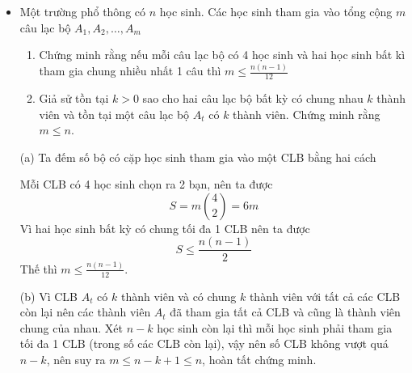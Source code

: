 \documentclass[11pt]{scrartcl}
\begin{document}
\setcounter{page}{1}
\thispagestyle{plain}
\begin{itemize}[label=, leftmargin=0em, itemsep=0.5em]
    
    \vspace{1em}
    
   
    \item \begin{bt}
        Một trường phổ thông có $n$ học sinh. Các học sinh tham gia vào tổng cộng $m$ câu lạc bộ $A_1,A_2,\dots,A_m$
        \begin{enumerate}[label=(\alph*)]
            \item Chứng minh rằng nếu mỗi câu lạc bộ có 4 học sinh và hai học sinh bất kì tham gia chung nhiều nhất 1 câu thì $m \leq \frac{n(n - 1)}{12}$
            \item Giả sử tồn tại $k > 0$ sao cho hai câu lạc bộ bất kỳ có chung nhau $k$ thành viên và tồn tại một câu lạc bộ $A_t$ có $k$ thành viên. Chứng minh rằng $m \leq n$.
        \end{enumerate}
    \end{bt}
    \begin{sol}

        (a) Ta đếm số bộ có cặp học sinh tham gia vào một CLB bằng hai cách 

         Mỗi CLB có 4 học sinh chọn ra 2 bạn, nên ta được 
        \[
            S = m\binom{4}{2} = 6m 
        \]
         Vì hai học sinh bất kỳ có chung tối đa 1 CLB nên ta được 
        \[
            S \leq \frac{n(n - 1)}{2}
        \]
        Thế thì $m \leq \frac{n(n - 1)}{12}$.

        (b) Vì CLB $A_t$ có $k$ thành viên và có chung $k$ thành viên với tất cả các CLB còn lại nên các thành viên $A_t$ đã tham gia tất cả CLB và cũng là thành viên chung của nhau. Xét $n - k$ học sinh còn lại thì mỗi học sinh phải tham gia tối đa 1 CLB (trong số các CLB còn lại), vậy nên số CLB không vượt quá $n - k$, nên suy ra $m \leq n - k + 1 \leq n$, hoàn tất chứng minh.
        
    \end{sol}
    

\end{itemize}
\end{document}
